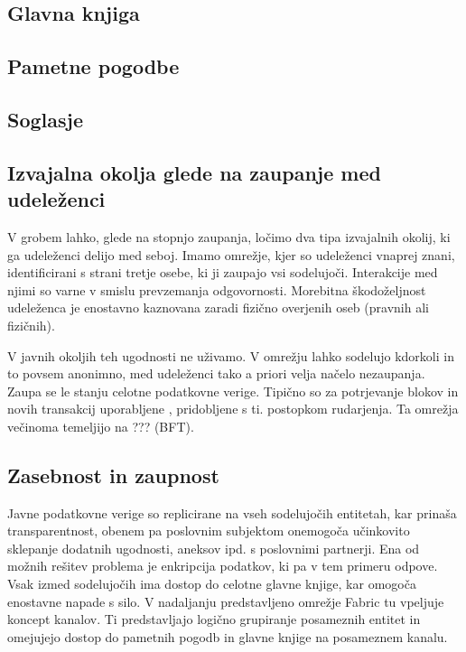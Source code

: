 \documentclass[a4paper, 12pt]{book}
\begin{document}
\subsection{Glavna knjiga}

\subsection{Pametne pogodbe}

\subsection{Soglasje}

\subsection{Izvajalna okolja glede na zaupanje med udeleženci}
V grobem lahko, glede na stopnjo zaupanja, ločimo dva tipa izvajalnih okolij, ki ga udeleženci delijo med seboj.
Imamo omrežje, kjer so udeleženci vnaprej znani, identificirani s strani tretje osebe, ki ji zaupajo vsi sodelujoči.
Interakcije med njimi so varne v smislu prevzemanja odgovornosti.
Morebitna škodoželjnost udeleženca je enostavno kaznovana zaradi fizično overjenih oseb (pravnih ali fizičnih).

V javnih okoljih teh ugodnosti ne uživamo.
V omrežju lahko sodelujo kdorkoli in to povsem anonimno,
med udeleženci tako a priori velja načelo nezaupanja.
Zaupa se le stanju celotne podatkovne verige.
Tipično so za potrjevanje blokov in novih transakcij uporabljene , pridobljene s ti. postopkom rudarjenja.
Ta omrežja večinoma temeljijo na ??? (BFT). \cite{hyperledgerDocs}

\subsection{Zasebnost in zaupnost}
Javne podatkovne verige so replicirane na vseh sodelujočih entitetah, kar prinaša transparentnost, obenem pa poslovnim subjektom onemogoča učinkovito sklepanje dodatnih ugodnosti, aneksov ipd. s poslovnimi partnerji.
Ena od možnih rešitev problema je enkripcija podatkov, ki pa v tem primeru odpove.
Vsak izmed sodelujočih ima dostop do celotne glavne knjige, kar omogoča enostavne napade s silo.
V nadaljanju predstavljeno omrežje Fabric tu vpeljuje koncept kanalov.
Ti predstavljajo logično grupiranje posameznih entitet in omejujejo dostop do pametnih pogodb in glavne knjige na posameznem kanalu. \cite{hyperledgerDocs}
\end{document}
